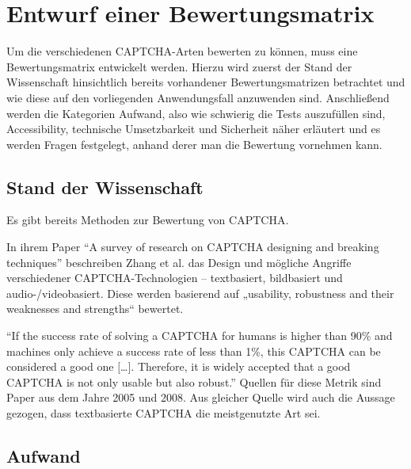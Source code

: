 \chapter{Entwurf einer Bewertungsmatrix}
\label{ch:matrix}

Um die verschiedenen CAPTCHA-Arten bewerten zu können, muss eine Bewertungsmatrix entwickelt werden. 
Hierzu wird zuerst der Stand der Wissenschaft hinsichtlich bereits vorhandener Bewertungsmatrizen betrachtet 
und wie diese auf den vorliegenden Anwendungsfall anzuwenden sind. 
Anschließend werden die Kategorien Aufwand, also wie schwierig die Tests auszufüllen sind, Accessibility, technische Umsetzbarkeit 
und Sicherheit näher erläutert und es werden Fragen festgelegt, anhand derer man die Bewertung vornehmen kann.

\section{Stand der Wissenschaft}

Es gibt bereits Methoden zur Bewertung von CAPTCHA.

In ihrem Paper ``A survey of research on CAPTCHA designing and breaking techniques'' beschreiben Zhang et al. das Design 
und mögliche Angriffe verschiedener CAPTCHA-Technologien – textbasiert, bildbasiert und audio-/videobasiert. 
Diese werden basierend auf „usability, robustness and their weaknesses and strengths“ bewertet. %

``If the success rate of solving a CAPTCHA for humans is higher than 90\% and machines only achieve 
a success rate of less than 1\%, this CAPTCHA can be considered a good one $[$\dots$]$. 
Therefore, it is widely accepted that a good CAPTCHA is not only usable but also robust.'' %
Quellen für diese Metrik sind Paper aus dem Jahre 2005 und 2008. 
Aus gleicher Quelle wird auch die Aussage gezogen, dass textbasierte CAPTCHA die meistgenutzte Art sei. 


\section{Aufwand}


